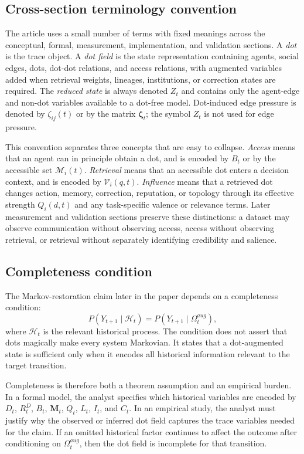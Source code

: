 \documentclass[11pt]{article}
\theoremstyle{remark}
\begin{document}
\subsection{Cross-section terminology convention}\label{cross-section-terminology-convention}

The article uses a small number of terms with fixed meanings across the conceptual, formal, measurement, implementation, and validation sections. A \emph{dot} is the trace object. A \emph{dot field} is the state representation containing agents, social edges, dots, dot-dot relations, and access relations, with augmented variables added when retrieval weights, lineages, institutions, or correction states are required. The \emph{reduced state} is always denoted $Z_t$ and contains only the agent-edge and non-dot variables available to a dot-free model. Dot-induced edge pressure is denoted by $\zeta_{ij}(t)$ or by the matrix $\boldsymbol{\zeta}_t$; the symbol $Z_t$ is not used for edge pressure.

This convention separates three concepts that are easy to collapse. \emph{Access} means that an agent can in principle obtain a dot, and is encoded by $B_t$ or by the accessible set $\mathcal M_i(t)$. \emph{Retrieval} means that an accessible dot enters a decision context, and is encoded by $\mathcal V_i(q,t)$. \emph{Influence} means that a retrieved dot changes action, memory, correction, reputation, or topology through its effective strength $Q_i(d,t)$ and any task-specific valence or relevance terms. Later measurement and validation sections preserve these distinctions: a dataset may observe communication without observing access, access without observing retrieval, or retrieval without separately identifying credibility and salience.

\subsection{Completeness condition}\label{dot-state-completeness}

The Markov-restoration claim later in the paper depends on a completeness condition:
\[
P(Y_{t+1}\mid \mathcal H_t)=P(Y_{t+1}\mid \Omega_t^{aug}),
\]
where $\mathcal H_t$ is the relevant historical process. The condition does not assert that dots magically make every system Markovian. It states that a dot-augmented state is sufficient only when it encodes all historical information relevant to the target transition.

Completeness is therefore both a theorem assumption and an empirical burden. In a formal model, the analyst specifies which historical variables are encoded by $D_t$, $R_t^D$, $B_t$, $\mathbf M_t$, $Q_t$, $L_t$, $I_t$, and $C_t$. In an empirical study, the analyst must justify why the observed or inferred dot field captures the trace variables needed for the claim. If an omitted historical factor continues to affect the outcome after conditioning on $\Omega_t^{aug}$, then the dot field is incomplete for that transition.
\end{document}
